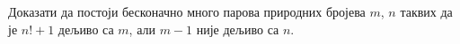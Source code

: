 Доказати да постоји бесконачно много парова природних бројева $m$, $n$ таквих
да је $n! + 1$ дељиво са $m$, али $m - 1$ није дељиво са $n$.

\solution

